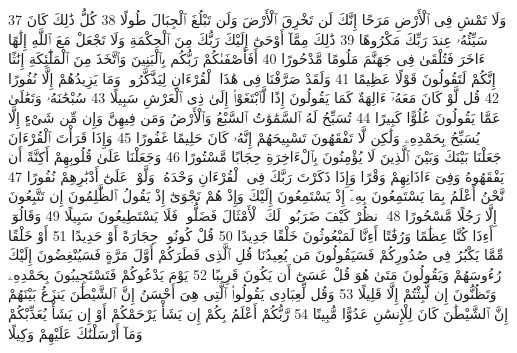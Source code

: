 {\tiny\colorbox{cl_aya}{37}} وَلَا تَمْشِ فِى ٱلْأَرْضِ مَرَحًا إِنَّكَ لَن تَخْرِقَ ٱلْأَرْضَ وَلَن تَبْلُغَ ٱلْجِبَالَ طُولًا
{\tiny\colorbox{cl_aya}{38}} كُلُّ ذَٰلِكَ كَانَ سَيِّئُهُۥ عِندَ رَبِّكَ مَكْرُوهًا
{\tiny\colorbox{cl_aya}{39}} ذَٰلِكَ مِمَّآ أَوْحَىٰٓ إِلَيْكَ رَبُّكَ مِنَ ٱلْحِكْمَةِ وَلَا تَجْعَلْ مَعَ ٱللَّهِ إِلَٰهًا ءَاخَرَ فَتُلْقَىٰ فِى جَهَنَّمَ مَلُومًا مَّدْحُورًا
{\tiny\colorbox{cl_aya}{40}} أَفَأَصْفَىٰكُمْ رَبُّكُم بِٱلْبَنِينَ وَٱتَّخَذَ مِنَ ٱلْمَلَٰٓئِكَةِ إِنَٰثًا إِنَّكُمْ لَتَقُولُونَ قَوْلًا عَظِيمًا
{\tiny\colorbox{cl_aya}{41}} وَلَقَدْ صَرَّفْنَا فِى هَٰذَا ٱلْقُرْءَانِ لِيَذَّكَّرُوا۟ وَمَا يَزِيدُهُمْ إِلَّا نُفُورًا
{\tiny\colorbox{cl_aya}{42}} قُل لَّوْ كَانَ مَعَهُۥٓ ءَالِهَةٌ كَمَا يَقُولُونَ إِذًا لَّٱبْتَغَوْا۟ إِلَىٰ ذِى ٱلْعَرْشِ سَبِيلًا
{\tiny\colorbox{cl_aya}{43}} سُبْحَٰنَهُۥ وَتَعَٰلَىٰ عَمَّا يَقُولُونَ عُلُوًّا كَبِيرًا
{\tiny\colorbox{cl_aya}{44}} تُسَبِّحُ لَهُ ٱلسَّمَٰوَٰتُ ٱلسَّبْعُ وَٱلْأَرْضُ وَمَن فِيهِنَّ وَإِن مِّن شَىْءٍ إِلَّا يُسَبِّحُ بِحَمْدِهِۦ وَلَٰكِن لَّا تَفْقَهُونَ تَسْبِيحَهُمْ إِنَّهُۥ كَانَ حَلِيمًا غَفُورًا
{\tiny\colorbox{cl_aya}{45}} وَإِذَا قَرَأْتَ ٱلْقُرْءَانَ جَعَلْنَا بَيْنَكَ وَبَيْنَ ٱلَّذِينَ لَا يُؤْمِنُونَ بِٱلْءَاخِرَةِ حِجَابًا مَّسْتُورًا
{\tiny\colorbox{cl_aya}{46}} وَجَعَلْنَا عَلَىٰ قُلُوبِهِمْ أَكِنَّةً أَن يَفْقَهُوهُ وَفِىٓ ءَاذَانِهِمْ وَقْرًا وَإِذَا ذَكَرْتَ رَبَّكَ فِى ٱلْقُرْءَانِ وَحْدَهُۥ وَلَّوْا۟ عَلَىٰٓ أَدْبَٰرِهِمْ نُفُورًا
{\tiny\colorbox{cl_aya}{47}} نَّحْنُ أَعْلَمُ بِمَا يَسْتَمِعُونَ بِهِۦٓ إِذْ يَسْتَمِعُونَ إِلَيْكَ وَإِذْ هُمْ نَجْوَىٰٓ إِذْ يَقُولُ ٱلظَّٰلِمُونَ إِن تَتَّبِعُونَ إِلَّا رَجُلًا مَّسْحُورًا
{\tiny\colorbox{cl_aya}{48}} ٱنظُرْ كَيْفَ ضَرَبُوا۟ لَكَ ٱلْأَمْثَالَ فَضَلُّوا۟ فَلَا يَسْتَطِيعُونَ سَبِيلًا
{\tiny\colorbox{cl_aya}{49}} وَقَالُوٓا۟ أَءِذَا كُنَّا عِظَٰمًا وَرُفَٰتًا أَءِنَّا لَمَبْعُوثُونَ خَلْقًا جَدِيدًا
{\tiny\colorbox{cl_aya}{50}} قُلْ كُونُوا۟ حِجَارَةً أَوْ حَدِيدًا
{\tiny\colorbox{cl_aya}{51}} أَوْ خَلْقًا مِّمَّا يَكْبُرُ فِى صُدُورِكُمْ فَسَيَقُولُونَ مَن يُعِيدُنَا قُلِ ٱلَّذِى فَطَرَكُمْ أَوَّلَ مَرَّةٍ فَسَيُنْغِضُونَ إِلَيْكَ رُءُوسَهُمْ وَيَقُولُونَ مَتَىٰ هُوَ قُلْ عَسَىٰٓ أَن يَكُونَ قَرِيبًا
{\tiny\colorbox{cl_aya}{52}} يَوْمَ يَدْعُوكُمْ فَتَسْتَجِيبُونَ بِحَمْدِهِۦ وَتَظُنُّونَ إِن لَّبِثْتُمْ إِلَّا قَلِيلًا
{\tiny\colorbox{cl_aya}{53}} وَقُل لِّعِبَادِى يَقُولُوا۟ ٱلَّتِى هِىَ أَحْسَنُ إِنَّ ٱلشَّيْطَٰنَ يَنزَغُ بَيْنَهُمْ إِنَّ ٱلشَّيْطَٰنَ كَانَ لِلْإِنسَٰنِ عَدُوًّا مُّبِينًا
{\tiny\colorbox{cl_aya}{54}} رَّبُّكُمْ أَعْلَمُ بِكُمْ إِن يَشَأْ يَرْحَمْكُمْ أَوْ إِن يَشَأْ يُعَذِّبْكُمْ وَمَآ أَرْسَلْنَٰكَ عَلَيْهِمْ وَكِيلًا
